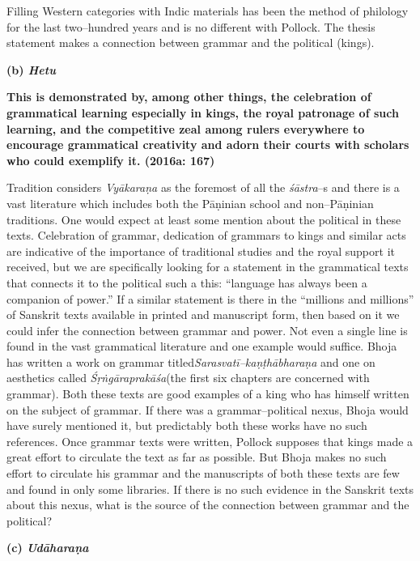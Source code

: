 Filling Western categories with Indic materials has been the method of philology for the last two–hundred years and is no different with Pollock. The thesis statement makes a connection between grammar and the political (kings).

\textbf{(b) \textit{Hetu}}

\begin{myquote}
\textbf{This is demonstrated by, among other things, the celebration of grammatical learning especially in kings, the royal patronage of such learning, and the competitive zeal among rulers everywhere to encourage grammatical creativity and adorn their courts with scholars who could exemplify it. (2016a: 167)}
\end{myquote}

Tradition considers \textit{Vyākaraṇa} as the foremost of all the \textit{śāstra}–s and there is a vast literature which includes both the Pāṇinian school and non–Pāṇinian traditions. One would expect at least some mention about the political in these texts. Celebration of grammar, dedication of grammars to kings and similar acts are indicative of the importance of traditional studies and the royal support it received, but we are specifically looking for a statement in the grammatical texts that connects it to the political such a this: “language has always been a companion of power.” If a similar statement is there in the “millions and millions” of Sanskrit texts available in printed and manuscript form, then based on it we could infer the connection between grammar and power. Not even a single line is found in the vast grammatical literature and one example would suffice. Bhoja has written a work on grammar titled\textit{Sarasvatī–kaṇṭhābharaṇa} and one on aesthetics called \textit{Śṛṅgāraprakāśa}(the first six chapters are concerned with grammar). Both these texts are good examples of a king who has himself written on the subject of grammar. If there was a grammar–political nexus, Bhoja would have surely mentioned it, but predictably both these works have no such references. Once grammar texts were written, Pollock supposes that kings made a great effort to circulate the text as far as possible. But Bhoja makes no such effort to circulate his grammar and the manuscripts of both these texts are few and found in only some libraries. If there is no such evidence in the Sanskrit texts about this nexus, what is the source of the connection between grammar and the political?

\textbf{(c) \textit{Udāharaṇa}}

